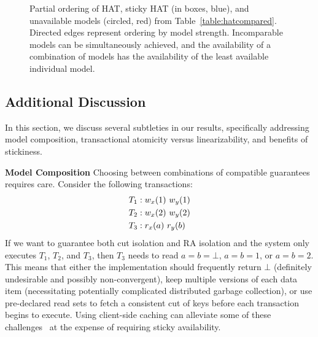 \begin{figure}[t!]
\label{fig:hat-order}
\caption{Partial ordering of HAT, sticky HAT (in boxes, blue), and
  unavailable models (circled, red) from
  Table~\protect\ref{table:hatcompared}. Directed edges represent
  ordering by model strength. Incomparable models can be
  simultaneously achieved, and the availability of a combination of
  models has the availability of the least available individual
  model.}\vspace{-1em}
\label{fig:hatcompared}
\end{figure}


\subsection{Additional Discussion}
\label{sec:discussion}

In this section, we discuss several subtleties in our results,
specifically addressing model composition, transactional atomicity
versus linearizability, and benefits of stickiness.

\vspace{.5em}\noindent\textbf{Model Composition} Choosing between
combinations of compatible guarantees requires care. Consider the
following transactions:
\begin{align*}
\small\vspace{-1em}
T_1 &: w_x(1)~w_y(1)
\\T_2 &: w_x(2)~w_y(2)
\\T_3 &: r_x(a)~r_y(b)\vspace{-1em}
\end{align*}
If we want to guarantee both cut isolation and RA isolation and the
system only executes $T_1$, $T_2$, and $T_3$, then $T_3$ needs to read
$a=b=\bot$, $a=b=1$, or $a=b=2$. This means that either the
implementation should frequently return $\bot$ (definitely undesirable
and possibly non-convergent), keep multiple versions of each data item
(necessitating potentially complicated distributed garbage
collection), or use pre-declared read sets to fetch a consistent cut
of keys before each transaction begins to execute. Using client-side
caching can alleviate some of these challenges~\cite{bolton, swift} at
the expense of requiring sticky availability.

